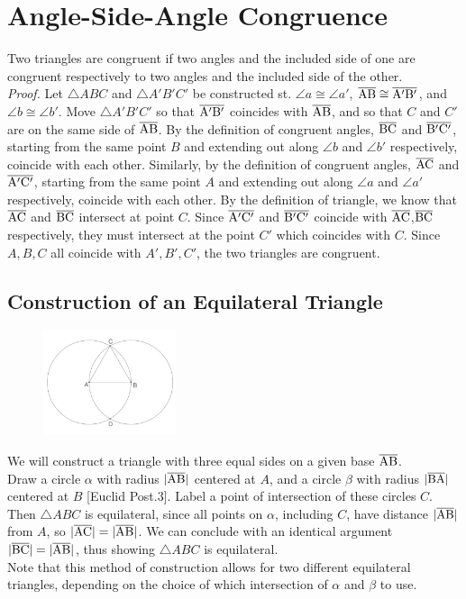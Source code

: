 \documentclass{report}
\begin{document}
\section{Angle-Side-Angle Congruence}
Two triangles are congruent if two angles and the included side of one are congruent respectively to two angles and the included side of the other.
\\[\baselineskip] \textit{Proof.} Let $\triangle{ABC}$ and $\triangle{A'B'C'}$ be constructed st. $\angle a \cong \angle a'$, $\overline{\rm AB} \cong \overline{\rm A'B'}$, and $\angle b \cong \angle b'$. Move $\triangle{A'B'C'}$ so that $\overline{\rm A'B'}$ coincides with $\overline{\rm AB}$, and so that $C$ and $C'$ are on the same side of $\overline{\rm AB}$. By the definition of congruent angles, $\overline{\rm BC}$ and $\overline{\rm B'C'}$, starting from the same point $B$ and extending out along $\angle b$ and $\angle b'$ respectively, coincide with each other. Similarly, by the definition of congruent angles, $\overline{\rm AC}$ and $\overline{\rm A'C'}$, starting from the same point $A$ and extending out along $\angle a$ and $\angle a'$ respectively, coincide with each other. By the definition of triangle, we know that $\overline{\rm AC}$ and $\overline{\rm BC}$ intersect at point $C$. Since $\overline{\rm A'C'}$ and $\overline{\rm B'C'}$ coincide with $\overline{\rm AC}$,$\overline{\rm BC}$ respectively, they must intersect at the point $C'$ which coincides with $C$. Since $A, B, C$ all coincide with $A', B', C'$, the two triangles are congruent.
\subsection{Construction of an Equilateral Triangle}
\begin{figure} %
    \centering
    \includegraphics[width=0.35\textwidth]{eqtri}
\end{figure}
We will construct a triangle with three equal sides on a given base $\overline{\rm AB}$.
\\[\baselineskip]
Draw a circle $\alpha$ with radius $|\overline{\rm AB}|$ centered at $A$, and a circle $\beta$ with radius $|\overline{\rm BA}|$ centered at $B$ [Euclid Post.\@ 3]. Label a point of intersection of these circles $C$. Then $\triangle{ABC}$ is equilateral, since all points on $\alpha$, including $C$, have distance $|\overline{\rm AB}|$ from $A$, so $|\overline{\rm AC}|= |\overline{\rm AB}|$. We can conclude with an identical argument $|\overline{\rm BC}|= |\overline{\rm AB}|$, thus showing $\triangle{ABC}$ is equilateral.
\\Note that this method of construction allows for two different equilateral triangles, depending on the choice of which intersection of $\alpha$ and $\beta$ to use.
\end{document}
